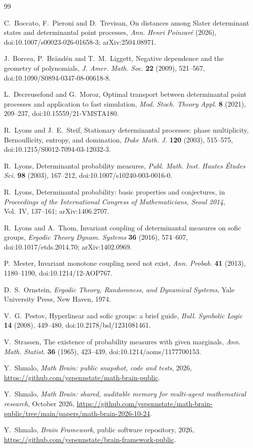 \documentclass[11pt]{amsart}
\theoremstyle{remark}
\numberwithin{equation}{section}
\begin{document}
\begin{thebibliography}{99}

C.~Boccato, F.~Pieroni and D.~Trevisan, On distances among Slater determinant states and determinantal point processes, \emph{Ann. Henri Poincar\'e} (2026), doi:10.1007/s00023-026-01658-3; arXiv:2504.08971.

J.~Borcea, P.~Br\"and\'en and T.~M.~Liggett, Negative dependence and the geometry of polynomials, \emph{J. Amer. Math. Soc.} \textbf{22} (2009), 521--567, doi:10.1090/S0894-0347-08-00618-8.

L.~Decreusefond and G.~Moroz, Optimal transport between determinantal point processes and application to fast simulation, \emph{Mod. Stoch. Theory Appl.} \textbf{8} (2021), 209--237, doi:10.15559/21-VMSTA180.

R.~Lyons and J.~E.~Steif, Stationary determinantal processes: phase multiplicity, Bernoullicity, entropy, and domination, \emph{Duke Math. J.} \textbf{120} (2003), 515--575, doi:10.1215/S0012-7094-03-12032-3.

R.~Lyons, Determinantal probability measures, \emph{Publ. Math. Inst. Hautes \'Etudes Sci.} \textbf{98} (2003), 167--212, doi:10.1007/s10240-003-0016-0.

R.~Lyons, Determinantal probability: basic properties and conjectures, in \emph{Proceedings of the International Congress of Mathematicians, Seoul 2014}, Vol.~IV, 137--161; arXiv:1406.2707.

R.~Lyons and A.~Thom, Invariant coupling of determinantal measures on sofic groups, \emph{Ergodic Theory Dynam. Systems} \textbf{36} (2016), 574--607, doi:10.1017/etds.2014.70; arXiv:1402.0969.

P.~Mester, Invariant monotone coupling need not exist, \emph{Ann. Probab.} \textbf{41} (2013), 1180--1190, doi:10.1214/12-AOP767.

D.~S.~Ornstein, \emph{Ergodic Theory, Randomness, and Dynamical Systems}, Yale University Press, New Haven, 1974.

V.~G.~Pestov, Hyperlinear and sofic groups: a brief guide, \emph{Bull. Symbolic Logic} \textbf{14} (2008), 449--480, doi:10.2178/bsl/1231081461.

V.~Strassen, The existence of probability measures with given marginals, \emph{Ann. Math. Statist.} \textbf{36} (1965), 423--439, doi:10.1214/aoms/1177700153.

 Y.~Shmalo, \emph{Math Brain: public snapshot, code and tests}, 2026, \url{https://github.com/yspennstate/math-brain-public}.

 Y.~Shmalo, \emph{Math Brain: shared, auditable memory for multi-agent mathematical research}, October 2026, \url{https://github.com/yspennstate/math-brain-public/tree/main/papers/math-brain-2026-10-24}.

 Y.~Shmalo, \emph{Brain Framework}, public software repository, 2026, \url{https://github.com/yspennstate/brain-framework-public}.

\end{thebibliography}
\end{document}
